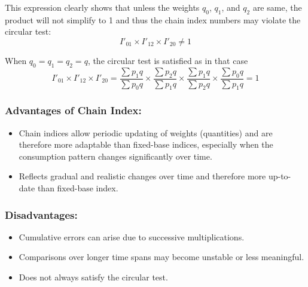\documentclass[twoside]{book}
\begin{document}
This expression clearly shows that unless the weights \(q_0\), \(q_1\), and \(q_2\) are same, the product will not simplify to 1 and thus the chain index numbers may violate the circular test:
\[
I'_{01} \times I'_{12} \times I'_{20} \ne 1
\]

When $q_0 = q_1 = q_2 = q$, the circular test is satisfied as in that case
\[
I'_{01} \times I'_{12} \times I'_{20} = \frac{\sum p_1 q}{\sum p_0 q}
  \times \frac{\sum p_2 q}{\sum p_1 q}
  \times \frac{\sum p_1 q}{\sum p_2 q}
  \times \frac{\sum p_0 q}{\sum p_1 q} = 1
\]

\subsubsection{Advantages of Chain Index:}
\begin{itemize}
\item Chain indices allow periodic updating of weights (quantities) and are therefore more adaptable than fixed-base indices, especially when the consumption pattern changes significantly over time.
  \item Reflects gradual and realistic changes over time and therefore more up-to-date than fixed-base index.
\end{itemize}


\subsubsection{Disadvantages:}
\begin{itemize}
  \item Cumulative errors can arise due to successive multiplications.
  \item Comparisons over longer time spans may become unstable or less meaningful.
  \item Does not always satisfy the circular test.
\end{itemize}
\end{document}
